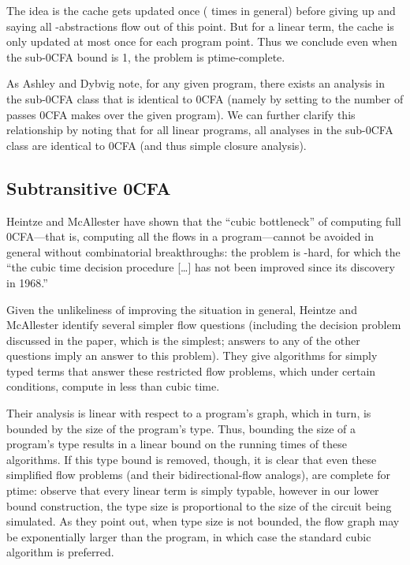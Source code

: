\documentclass{llncs}
\newcommand\ptime{{\sc ptime}}
\begin{document}
The idea is the cache gets updated once ( times in general) before
giving up and saying all -abstractions flow out of this
point.  But for a linear term, the cache is only updated at most once
for each program point.  Thus we conclude even when the sub-0CFA bound
is 1, the problem is \ptime-complete.

As Ashley and Dybvig note, for any given program, there exists an
analysis in the sub-0CFA class that is identical to 0CFA (namely by
setting  to the number of passes 0CFA makes over the given
program).  We can further clarify this relationship by noting that for
all linear programs, all analyses in the sub-0CFA class are identical
to 0CFA (and thus simple closure analysis).

\subsection{Subtransitive 0CFA}

Heintze and McAllester \cite{heintze-mcallester-97b} have shown that
the ``cubic bottleneck'' of computing full 0CFA---that is, computing
all the flows in a program---cannot be avoided in general without
combinatorial breakthroughs: the problem is {}-hard, for
which the ``the cubic time decision procedure [\dots] has not been
improved since its discovery in 1968.''

Given the unlikeliness of improving the situation in general, Heintze
and McAllester \cite{heintze-mcallester-97a} identify several simpler
flow questions (including the decision problem discussed in the paper,
which is the simplest; answers to any of the other questions imply an
answer to this problem).  They give algorithms for simply typed terms
that answer these restricted flow problems, which under certain
conditions, compute in less than cubic time.

Their analysis is linear with respect to a program's graph, which in
turn, is bounded by the size of the program's type.  Thus, bounding
the size of a program's type results in a linear bound on the running
times of these algorithms.  If this type bound is removed, though, it
is clear that even these simplified flow problems (and their
bidirectional-flow analogs), are complete for \ptime: observe that
every linear term is simply typable, however in our lower bound
construction, the type size is proportional to the size of the circuit
being simulated.  As they point out, when type size is not bounded,
the flow graph may be exponentially larger than the program, in which
case the standard cubic algorithm is preferred.
\end{document}
